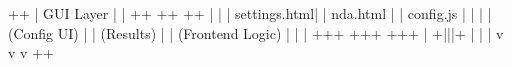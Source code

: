\documentclass[a4paper,11pt,english,openany,oneside]{sphinxmanual}
\begin{document}
\begin{sphinxVerbatim}[commandchars=\\\{\}]
+\PYGZhy{}\PYGZhy{}\PYGZhy{}\PYGZhy{}\PYGZhy{}\PYGZhy{}\PYGZhy{}\PYGZhy{}\PYGZhy{}\PYGZhy{}\PYGZhy{}\PYGZhy{}\PYGZhy{}\PYGZhy{}\PYGZhy{}\PYGZhy{}\PYGZhy{}\PYGZhy{}\PYGZhy{}\PYGZhy{}\PYGZhy{}\PYGZhy{}\PYGZhy{}\PYGZhy{}\PYGZhy{}\PYGZhy{}\PYGZhy{}\PYGZhy{}\PYGZhy{}\PYGZhy{}\PYGZhy{}\PYGZhy{}\PYGZhy{}\PYGZhy{}\PYGZhy{}\PYGZhy{}\PYGZhy{}\PYGZhy{}\PYGZhy{}\PYGZhy{}\PYGZhy{}\PYGZhy{}\PYGZhy{}\PYGZhy{}\PYGZhy{}\PYGZhy{}\PYGZhy{}\PYGZhy{}\PYGZhy{}\PYGZhy{}\PYGZhy{}\PYGZhy{}\PYGZhy{}\PYGZhy{}\PYGZhy{}\PYGZhy{}\PYGZhy{}\PYGZhy{}\PYGZhy{}\PYGZhy{}\PYGZhy{}+
|                         GUI Layer                           |
|  +\PYGZhy{}\PYGZhy{}\PYGZhy{}\PYGZhy{}\PYGZhy{}\PYGZhy{}\PYGZhy{}\PYGZhy{}\PYGZhy{}\PYGZhy{}\PYGZhy{}\PYGZhy{}\PYGZhy{}\PYGZhy{}+  +\PYGZhy{}\PYGZhy{}\PYGZhy{}\PYGZhy{}\PYGZhy{}\PYGZhy{}\PYGZhy{}\PYGZhy{}\PYGZhy{}\PYGZhy{}\PYGZhy{}\PYGZhy{}\PYGZhy{}\PYGZhy{}+  +\PYGZhy{}\PYGZhy{}\PYGZhy{}\PYGZhy{}\PYGZhy{}\PYGZhy{}\PYGZhy{}\PYGZhy{}\PYGZhy{}\PYGZhy{}\PYGZhy{}\PYGZhy{}\PYGZhy{}\PYGZhy{}\PYGZhy{}\PYGZhy{}\PYGZhy{}\PYGZhy{}\PYGZhy{}+  |
|  | settings.html|  |   nda.html   |  |     config.js     |  |
|  |  (Config UI) |  |  (Results)   |  | (Frontend Logic)  |  |
|  +\PYGZhy{}\PYGZhy{}\PYGZhy{}\PYGZhy{}\PYGZhy{}\PYGZhy{}+\PYGZhy{}\PYGZhy{}\PYGZhy{}\PYGZhy{}\PYGZhy{}\PYGZhy{}\PYGZhy{}+  +\PYGZhy{}\PYGZhy{}\PYGZhy{}\PYGZhy{}\PYGZhy{}\PYGZhy{}+\PYGZhy{}\PYGZhy{}\PYGZhy{}\PYGZhy{}\PYGZhy{}\PYGZhy{}\PYGZhy{}+  +\PYGZhy{}\PYGZhy{}\PYGZhy{}\PYGZhy{}\PYGZhy{}\PYGZhy{}\PYGZhy{}\PYGZhy{}\PYGZhy{}+\PYGZhy{}\PYGZhy{}\PYGZhy{}\PYGZhy{}\PYGZhy{}\PYGZhy{}\PYGZhy{}\PYGZhy{}\PYGZhy{}+  |
+\PYGZhy{}\PYGZhy{}\PYGZhy{}\PYGZhy{}\PYGZhy{}\PYGZhy{}\PYGZhy{}\PYGZhy{}\PYGZhy{}|\PYGZhy{}\PYGZhy{}\PYGZhy{}\PYGZhy{}\PYGZhy{}\PYGZhy{}\PYGZhy{}\PYGZhy{}\PYGZhy{}\PYGZhy{}\PYGZhy{}\PYGZhy{}\PYGZhy{}\PYGZhy{}\PYGZhy{}\PYGZhy{}\PYGZhy{}|\PYGZhy{}\PYGZhy{}\PYGZhy{}\PYGZhy{}\PYGZhy{}\PYGZhy{}\PYGZhy{}\PYGZhy{}\PYGZhy{}\PYGZhy{}\PYGZhy{}\PYGZhy{}\PYGZhy{}\PYGZhy{}\PYGZhy{}\PYGZhy{}\PYGZhy{}\PYGZhy{}\PYGZhy{}\PYGZhy{}\PYGZhy{}\PYGZhy{}\PYGZhy{}|\PYGZhy{}\PYGZhy{}\PYGZhy{}\PYGZhy{}\PYGZhy{}\PYGZhy{}\PYGZhy{}\PYGZhy{}\PYGZhy{}\PYGZhy{}+
          |                 |                       |
          v                 v                       v
+\PYGZhy{}\PYGZhy{}\PYGZhy{}\PYGZhy{}\PYGZhy{}\PYGZhy{}\PYGZhy{}\PYGZhy{}\PYGZhy{}\PYGZhy{}\PYGZhy{}\PYGZhy{}\PYGZhy{}\PYGZhy{}\PYGZhy{}\PYGZhy{}\PYGZhy{}\PYGZhy{}\PYGZhy{}\PYGZhy{}\PYGZhy{}\PYGZhy{}\PYGZhy{}\PYGZhy{}\PYGZhy{}\PYGZhy{}\PYGZhy{}\PYGZhy{}\PYGZhy{}\PYGZhy{}\PYGZhy{}\PYGZhy{}\PYGZhy{}\PYGZhy{}\PYGZhy{}\PYGZhy{}\PYGZhy{}\PYGZhy{}\PYGZhy{}\PYGZhy{}\PYGZhy{}\PYGZhy{}\PYGZhy{}\PYGZhy{}\PYGZhy{}\PYGZhy{}\PYGZhy{}\PYGZhy{}\PYGZhy{}\PYGZhy{}\PYGZhy{}\PYGZhy{}\PYGZhy{}\PYGZhy{}\PYGZhy{}\PYGZhy{}\PYGZhy{}\PYGZhy{}\PYGZhy{}\PYGZhy{}\PYGZhy{}+

\end{sphinxVerbatim}
\end{document}
